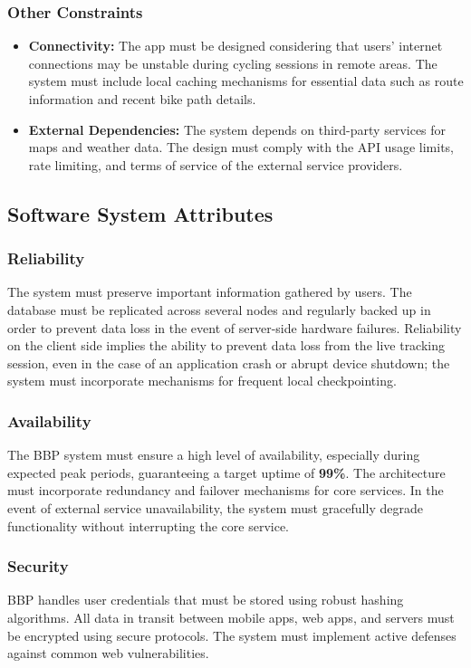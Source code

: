 \subsubsection{Other Constraints}
\begin{itemize}
    \item[] \textbf{Connectivity:} The app must be designed considering that users' internet connections may be unstable during cycling sessions in remote areas. The system must include local caching mechanisms for essential data such as route information and recent bike path details.
    
    \item[] \textbf{External Dependencies:} The system depends on third-party services for maps and weather data. The design must comply with the API usage limits, rate limiting, and terms of service of the external service providers.
\end{itemize}

\subsection{Software System Attributes}

\subsubsection{Reliability} 
The system must preserve important information gathered by users. The database must be replicated across several nodes and regularly backed up in order to prevent data loss in the event of server-side hardware failures.
Reliability on the client side implies the ability to prevent data loss from the live tracking session, even in the case of an application crash or abrupt device shutdown; the system must incorporate mechanisms for frequent local checkpointing.


\subsubsection{Availability} 
The BBP system must ensure a high level of availability, especially during expected peak periods, guaranteeing a target uptime of \textbf{99\%}. 
The architecture must incorporate redundancy and failover mechanisms for core services. In the event of external service unavailability, the system must gracefully degrade functionality without interrupting the core service.
 
\subsubsection{Security} 
BBP handles user credentials that must be stored using robust hashing algorithms. All data in transit between mobile apps, web apps, and servers must be encrypted using secure protocols. 
The system must implement active defenses against common web vulnerabilities.

